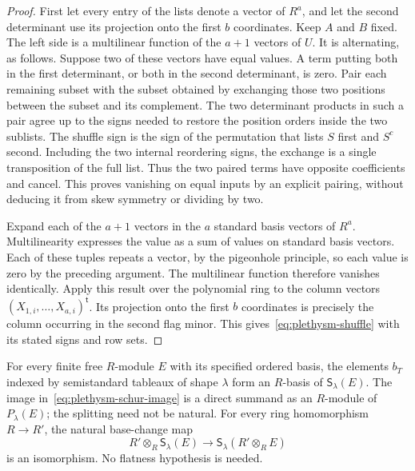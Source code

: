 \begin{proof}
First let every entry of the lists denote a vector of $R^a$, and
let the second determinant use its projection onto the first $b$
coordinates. Keep $A$ and $B$ fixed. The left side is a multilinear
function of the $a+1$ vectors of $U$. It is alternating, as follows.
Suppose two of these vectors have equal values. A term putting both
in the first determinant, or both in the second determinant, is
zero. Pair each remaining subset with the subset obtained by
exchanging those two positions between the subset and its complement.
The two determinant products in such a pair agree up to the signs
needed to restore the position orders inside the two sublists.
The shuffle sign is the sign of the permutation that lists $S$
first and $S^c$ second. Including the two internal reordering signs,
the exchange is a single transposition of the full list. Thus the
two paired terms have opposite coefficients and cancel. This proves
vanishing on equal inputs by an explicit pairing, without deducing
it from skew symmetry or dividing by two.

Expand each of the $a+1$ vectors in the $a$ standard basis vectors
of $R^a$. Multilinearity expresses the value as a sum of values on
standard basis vectors. Each of these tuples repeats a vector, by
the pigeonhole principle, so each value is zero by the preceding
argument. The multilinear function therefore vanishes identically.
Apply this result over the polynomial ring to the column vectors
$(X_{1,i},\ldots,X_{a,i})^{\mathsf t}$. Its projection onto the first
$b$ coordinates is precisely the column occurring in the second
flag minor. This gives~\eqref{eq:plethysm-shuffle} with its stated
signs and row sets.
\end{proof}

\begin{theorem}
\label{thm:plethysm-integral-basis}
For every finite free $R$-module $E$ with its specified ordered basis,
the elements $b_T$ indexed by semistandard tableaux of shape $\lambda$
form an $R$-basis of $\mathsf S_\lambda(E)$.
The image in~\eqref{eq:plethysm-schur-image} is a direct summand as an
$R$-module of $P_\lambda(E)$; the splitting need not be natural.
For every ring homomorphism $R\to R'$, the natural base-change map
\begin{equation}
 R'\otimes_R\mathsf S_\lambda(E)
 \longrightarrow
 \mathsf S_\lambda(R'\otimes_R E)
 \label{eq:plethysm-basechange}
\end{equation}
is an isomorphism. No flatness hypothesis is needed.
\end{theorem}

